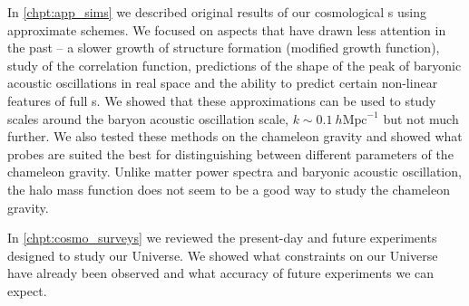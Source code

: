 In \autoref{chpt:app_sims} we described original results of our cosmological \nbodysim s using approximate schemes. We focused on aspects that have drawn less attention in the past -- a slower growth of structure formation (modified growth function), study of the correlation function, predictions of the shape of the peak of baryonic acoustic oscillations in real space and the ability to predict certain non-linear features of full \nbody s. We showed that these approximations can be used to study scales around the baryon acoustic oscillation scale, $k\sim 0.1~h\text{Mpc}^{-1}$ but not much further. We also tested these methods on the chameleon gravity and showed what probes are suited the best for distinguishing between different parameters of the chameleon gravity. Unlike matter power spectra and baryonic acoustic oscillation, the halo mass function does not seem to be a good way to study the chameleon gravity.

In \autoref{chpt:cosmo_surveys} we reviewed the present-day and future experiments designed to study our Universe. We showed what constraints on our Universe have already been observed and what accuracy of future experiments we can expect.

